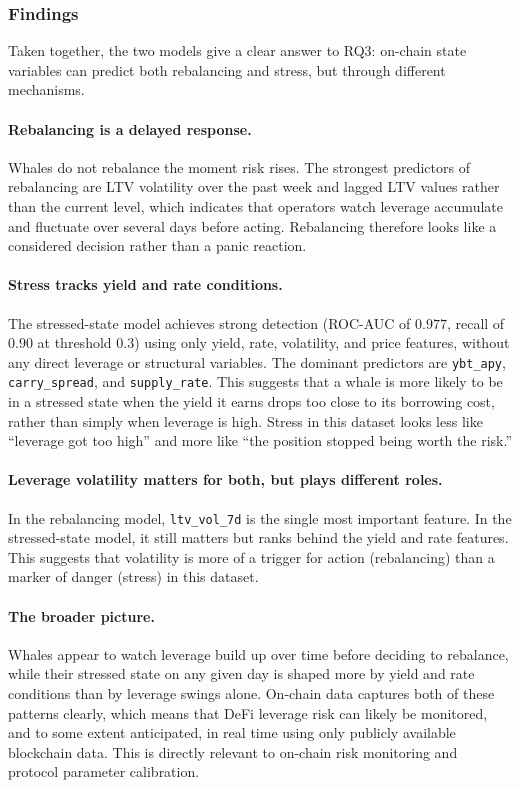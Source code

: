 \subsubsection{Findings}
\label{sec:ml-findings}

Taken together, the two models give a clear answer to RQ3: on-chain state
variables can predict both rebalancing and stress, but through different
mechanisms.

\paragraph{Rebalancing is a delayed response.}
Whales do not rebalance the moment risk rises. The strongest predictors
of rebalancing are LTV volatility over the past week and lagged LTV
values rather than the current level, which indicates that operators
watch leverage accumulate and fluctuate over several days before acting.
Rebalancing therefore looks like a considered decision rather than a
panic reaction.

\paragraph{Stress tracks yield and rate conditions.}
The stressed-state model achieves strong detection (ROC-AUC of $0.977$,
recall of $0.90$ at threshold $0.3$) using only yield, rate, volatility,
and price features, without any direct leverage or structural variables.
The dominant predictors are \texttt{ybt\_apy}, \texttt{carry\_spread},
and \texttt{supply\_rate}. This suggests that a whale is more likely to
be in a stressed state when the yield it earns drops too close to its
borrowing cost, rather than simply when leverage is high. Stress in this
dataset looks less like ``leverage got too high'' and more like ``the
position stopped being worth the risk.''

\paragraph{Leverage volatility matters for both, but plays different
roles.}
In the rebalancing model, \texttt{ltv\_vol\_7d} is the single most
important feature. In the stressed-state model, it still matters but
ranks behind the yield and rate features. This suggests that volatility
is more of a trigger for action (rebalancing) than a marker of danger
(stress) in this dataset.

\paragraph{The broader picture.}
Whales appear to watch leverage build up over time before deciding to
rebalance, while their stressed state on any given day is shaped more
by yield and rate conditions than by leverage swings alone. On-chain
data captures both of these patterns clearly, which means that DeFi
leverage risk can likely be monitored, and to some extent anticipated,
in real time using only publicly available blockchain data. This is
directly relevant to on-chain risk monitoring and protocol parameter
calibration.
